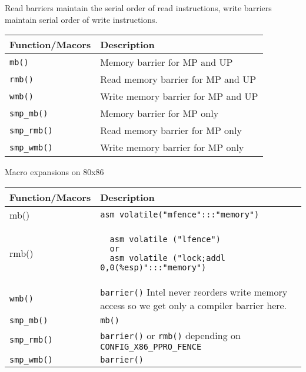 \documentclass{article}
\begin{document}

Read barriers maintain the serial order of read instructions, write
barriers maintain serial order of write instructions.

\begin{center}
  \begin{tabular}{| l | l | }    
    \hline
    Function/Macors & Description \\ \hline
    \lstinline{mb()} & Memory barrier for MP and UP \\ 
    \lstinline{rmb()} & Read memory barrier for MP and UP  \\ 
    \lstinline{wmb()} &  Write memory barrier for MP and UP \\
    \lstinline{smp_mb()} &  Memory barrier for MP only \\
    \lstinline{smp_rmb()} &  Read memory barrier for MP only \\
    \lstinline{smp_wmb()} &  Write memory barrier for MP only \\
    \hline
  \end{tabular}
\end{center}
  Macro expansions on  80x86

\begin{center} 
  \begin{tabular}{ | l | p{9 cm} | }    
    \hline
    Function/Macors & Description \\ \hline
    mb() & \lstinline{asm volatile("mfence":::"memory")}  \\  \hline
    rmb() &
\begin{lstlisting}
  asm volatile ("lfence")
  or
  asm volatile ("lock;addl 0,0(%esp)":::"memory")
\end{lstlisting}
      \\ \hline
      \lstinline{wmb()} & \lstinline{barrier()}
      Intel never reorders write memory access so we get only a compiler barrier here.  \\ \hline
    \lstinline{smp_mb()}  & \lstinline{mb()}   \\ \hline
    \lstinline{smp_rmb()} &  \lstinline{barrier()} or \lstinline{rmb()} depending on \lstinline{CONFIG_X86_PPRO_FENCE}\\ \hline
    \lstinline{smp_wmb()} & \lstinline{barrier()} \\     \hline
  \end{tabular}
\end{center}


\end{document}
